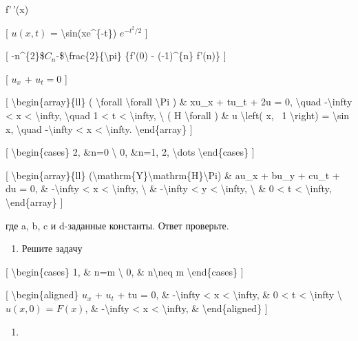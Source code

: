 \documentclass[
]{article}
\providecommand{\tightlist}{%
  \setlength{\itemsep}{0pt}\setlength{\parskip}{0pt}}
\begin{document}
{{{f'\,'(x)

{[} \(u(x, t)\) = \textbackslash sin(xe\^{}\{-t\}) \(e^{-t^2/2}\) {]}

{[}
-n\^{}\{2\}\$\(C_{n}\)-\$\textbackslash frac\{2\}\{\textbackslash pi\}
\{f'(0) - (-1)\^{}\{n\} f'(n)\} {]}

{[} \(u_x\) + \(u_t = 0\) {]}

{[} \textbackslash begin\{array\}\{ll\} ( \textbackslash forall
\textbackslash forall \textbackslash Pi ) \& xu\_x + tu\_t + 2u = 0,
\textbackslash quad -\textbackslash infty \textless{} x \textless{}
\textbackslash infty, \textbackslash quad 1 \textless{} t \textless{}
\textbackslash infty, \textbackslash{} ( H \textbackslash forall ) \& u
\textbackslash left( x, ~1 \textbackslash right) = \textbackslash sin x,
\textbackslash quad -\textbackslash infty \textless{} x \textless{}
\textbackslash infty. \textbackslash end\{array\} {]}

{[} \textbackslash begin\{cases\} 2, \&n=0 \textbackslash{} 0, \&n=1, 2,
\textbackslash dots \textbackslash end\{cases\} {]}

{[} \textbackslash begin\{array\}\{ll\}
(\textbackslash mathrm\{Y\}\textbackslash mathrm\{H\}\textbackslash Pi)
\& au\_x + bu\_y + cu\_t + du = 0, \& -\textbackslash infty \textless{}
x \textless{} \textbackslash infty, \textbackslash{} \&
-\textbackslash infty \textless{} y \textless{} \textbackslash infty,
\textbackslash{} \& 0 \textless{} t \textless{} \textbackslash infty,
\textbackslash end\{array\} {]}

где a, b, c и d-заданные константы. Ответ проверьте.

\begin{enumerate}
\def\labelenumi{\arabic{enumi}.}
\setcounter{enumi}{3}
\tightlist
\item
  Решите задачу
\end{enumerate}

{[} \textbackslash begin\{cases\} 1, \& n=m \textbackslash{} 0, \&
n\textbackslash neq m \textbackslash end\{cases\} {]}

{[} \textbackslash begin\{aligned\} \(u_x\) + \(u_t\) + tu = 0, \&
-\textbackslash infty \textless{} x \textless{} \textbackslash infty, \&
0 \textless{} t \textless{} \textbackslash infty \textbackslash{}
\(u(x, 0)\) = \(F(x)\), \& -\textbackslash infty \textless{} x
\textless{} \textbackslash infty, \& \textbackslash end\{aligned\} {]}

\begin{enumerate}
\def\labelenumi{\arabic{enumi}.}
\setcounter{enumi}{5}
\tightlist
\item
\end{enumerate}

}}}
\end{document}
